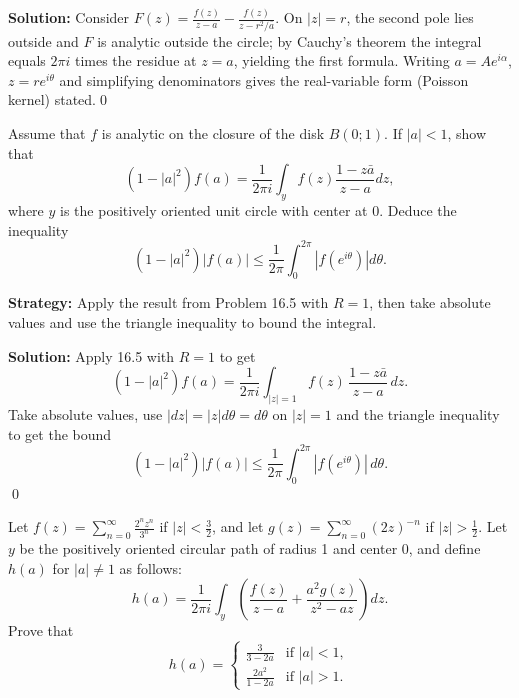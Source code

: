 \bigskip\noindent\textbf{Solution:}
Consider $F(z)=\frac{f(z)}{z-a}-\frac{f(z)}{z-r^2/\bar a}$. On $|z|=r$, the second pole lies outside and $F$ is analytic outside the circle; by Cauchy's theorem the integral equals $2\pi i$ times the residue at $z=a$, yielding the first formula. Writing $a=Ae^{i\alpha}$, $z=re^{i\theta}$ and simplifying denominators gives the real-variable form (Poisson kernel) stated.\qed


\begin{problembox}
\begin{problemstatement}
Assume that \( f \) is analytic on the closure of the disk \( B(0; 1) \). If \( |a| < 1 \), show that
\[(1 - |a|^2)f(a) = \frac{1}{2\pi i} \int_{y} f(z) \frac{1 - z\bar{a}}{z - a} dz,\]
where \( y \) is the positively oriented unit circle with center at 0. Deduce the inequality
\[(1 - |a|^2) |f(a)| \leq \frac{1}{2\pi} \int_0^{2\pi} |f(e^{i\theta})| d\theta.\]
\end{problemstatement}
\end{problembox}

\noindent\textbf{Strategy:} Apply the result from Problem 16.5 with \( R = 1 \), then take absolute values and use the triangle inequality to bound the integral.

\bigskip\noindent\textbf{Solution:}
Apply 16.5 with $R=1$ to get
\[(1-|a|^2)f(a)=\frac{1}{2\pi i}\int_{|z|=1} f(z)\,\frac{1-z\bar a}{z-a}\,dz.\]
Take absolute values, use $|dz|=|z|d\theta=d\theta$ on $|z|=1$ and the triangle inequality to get the bound
\[(1-|a|^2)|f(a)|\le \frac{1}{2\pi}\int_0^{2\pi}|f(e^{i\theta})|\,d\theta.\]\qed


\begin{problembox}
\begin{problemstatement}
Let \( f(z) = \sum_{n=0}^{\infty} \frac{2^n z^n}{3^n} \) if \( |z| < \frac{3}{2} \), and let \( g(z) = \sum_{n=0}^{\infty} (2z)^{-n} \) if \( |z| > \frac{1}{2} \). Let \( y \) be the positively oriented circular path of radius 1 and center 0, and define \( h(a) \) for \( |a| \neq 1 \) as follows:
\[h(a) = \frac{1}{2\pi i} \int_y \left( \frac{f(z)}{z - a} + \frac{a^2 g(z)}{z^2 - az} \right) dz.\]
Prove that
\[h(a) = \begin{cases} 
\frac{3}{3 - 2a} & \text{if } |a| < 1, \\ 
\frac{2a^2}{1 - 2a} & \text{if } |a| > 1.
\end{cases}\]
\end{problemstatement}
\end{problembox}

